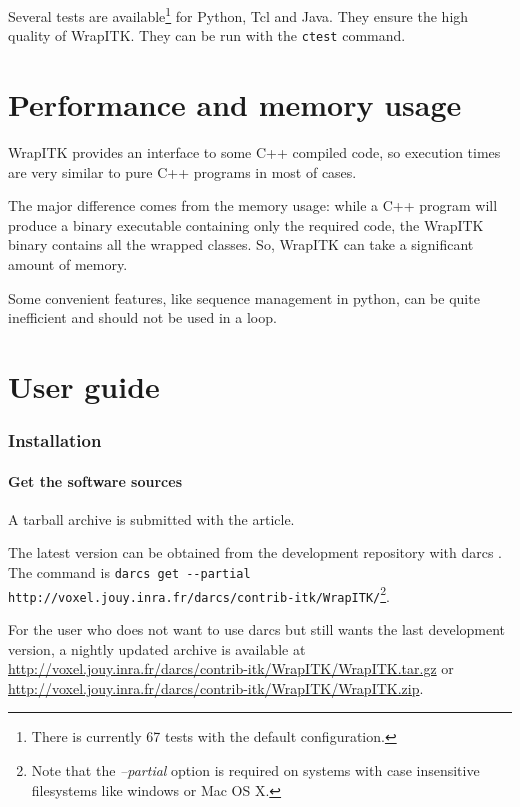 \documentclass{InsightArticle}
\begin{document}
Several tests are available\footnote{There is currently 67 tests with the default
configuration.} for Python, Tcl and Java. They ensure the high quality of WrapITK.
They can be run with the \verb$ctest$ command.

\newpage
\part{Performance and memory usage}

WrapITK provides an interface to some C++ compiled code, so execution times
are very similar to pure C++ programs in most of cases.

The major difference comes from the memory
usage: while a C++ program will produce a binary executable containing only
the required code, the WrapITK binary contains all the wrapped classes. So,
WrapITK can take a significant amount of memory.

Some convenient features, like sequence management in python, can be quite
inefficient and should not be used in a loop.

\newpage
\part{User guide}

  \section{Installation}

    \subsection{Get the software sources}

A tarball archive is submitted with the article.

The latest version can be obtained from the development repository with darcs \cite{DarcsWebSite}.
The command is
\verb$darcs get --partial http://voxel.jouy.inra.fr/darcs/contrib-itk/WrapITK/$\footnote{Note
that the {\em --partial} option is required on systems with case insensitive filesystems like
windows or Mac OS X.}.

For the user who does not want to use darcs \cite{DarcsWebSite} but still wants the last development version,
a nightly updated archive is available at
\url{http://voxel.jouy.inra.fr/darcs/contrib-itk/WrapITK/WrapITK.tar.gz} or
\url{http://voxel.jouy.inra.fr/darcs/contrib-itk/WrapITK/WrapITK.zip}.
\end{document}
